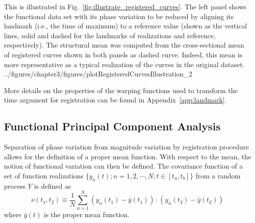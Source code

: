 This is illustrated in Fig.~\ref{fig:illustrate_registered_curves}.
The left panel shows the functional data set with its phase variation to be reduced by aligning its landmark (i.e., the time of maximum) to a reference value 
(shown as the vertical lines, solid and dashed for the landmarks of realizations and reference, respectively).
The structural mean was computed from the cross-sectional mean of registered curves shown in both panels as dashed curve. 
Indeed, this mean is more representative as a typical realization of the curves in the original dataset.
{../figures/chapter3/figures/plotRegisteredCurvesIllustration_2}

More details on the properties of the warping functions used to transform the time argument for registration can be found in Appendix~\ref{app:landmark}.

\subsection{Functional Principal Component Analysis}\label{sub:sa_fpca}

Separation of phase variation from magnitude variation by registration procedure allows for the definition of a proper mean function.
With respect to the mean, the notion of functional variation can then be defined.
The covariance function of a set of function realizations $\{y_n(t);n = 1, 2, \cdots, N; t \in [t_a,t_b]\}$ from a random process $Y$ is defined as
\begin{equation}
	\nu (t_1, t_2) \equiv \frac{1}{N} \sum_{n=1}^{N} (y_n(t_1) - \bar{y}(t_1)) \cdot (y_n(t_2) - \bar{y}(t_2))
\label{eq:covariance_function}
\end{equation}
where $\bar{y} (t)$ is the proper mean function.

